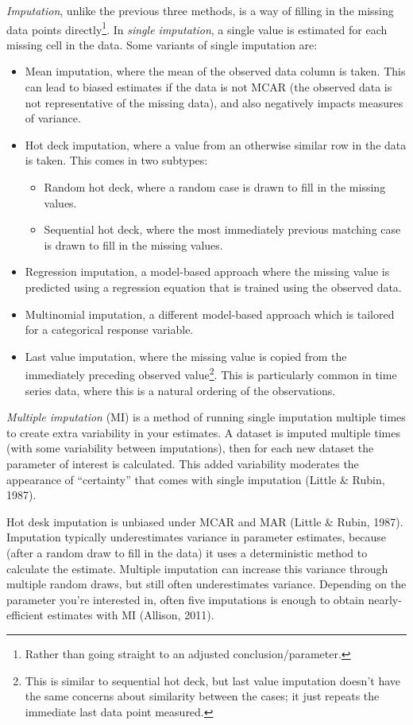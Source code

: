 \documentclass[12pt,twoside]{reedthesis}
\providecommand{\tightlist}{%
  \setlength{\itemsep}{0pt}\setlength{\parskip}{0pt}}
\begin{document}
\emph{Imputation}, unlike the previous three methods, is a way of filling in the missing data points directly\footnote{Rather than going straight to an adjusted conclusion/parameter.}. In \emph{single imputation}, a single value is estimated for each missing cell in the data. Some variants of single imputation are:
\begin{itemize}
\item
  Mean imputation, where the mean of the observed data column is taken. This can lead to biased estimates if the data is not MCAR (the observed data is not representative of the missing data), and also negatively impacts measures of variance.
\item
  Hot deck imputation, where a value from an otherwise similar row in the data is taken. This comes in two subtypes:
  \begin{itemize}
  \tightlist
  \item
    Random hot deck, where a random case is drawn to fill in the missing values.
  \item
    Sequential hot deck, where the most immediately previous matching case is drawn to fill in the missing values.
  \end{itemize}
\item
  Regression imputation, a model-based approach where the missing value is predicted using a regression equation that is trained using the observed data.
\item
  Multinomial imputation, a different model-based approach which is tailored for a categorical response variable.
\item
  Last value imputation, where the missing value is copied from the immediately preceding observed value\footnote{This is similar to sequential hot deck, but last value imputation doesn't have the same concerns about similarity between the cases; it just repeats the immediate last data point measured.}. This is particularly common in time series data, where this is a natural ordering of the observations.
\end{itemize}
\emph{Multiple imputation} (MI) is a method of running single imputation multiple times to create extra variability in your estimates. A dataset is imputed multiple times (with some variability between imputations), then for each new dataset the parameter of interest is calculated. This added variability moderates the appearance of ``certainty'' that comes with single imputation (Little \& Rubin, 1987).

Hot desk imputation is unbiased under MCAR and MAR (Little \& Rubin, 1987). Imputation typically underestimates variance in parameter estimates, because (after a random draw to fill in the data) it uses a deterministic method to calculate the estimate. Multiple imputation can increase this variance through multiple random draws, but still often underestimates variance. Depending on the parameter you're interested in, often five imputations is enough to obtain nearly-efficient estimates with MI (Allison, 2011).
\end{document}

